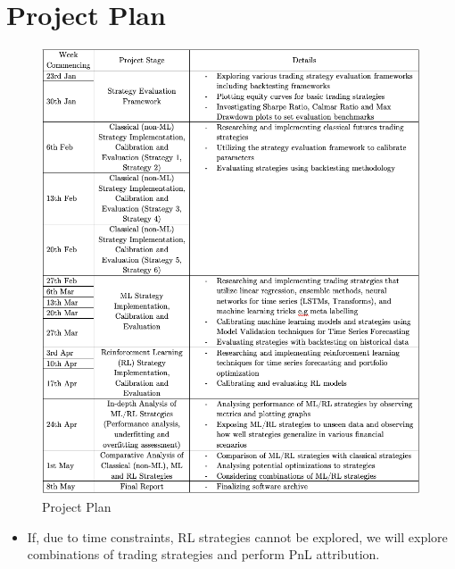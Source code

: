 \chapter{Project Plan}


\begin{figure}[h]
    \centering
    \includegraphics[scale=0.6]{project_plan/Screenshot 2023-01-26 at 01.00.03.png}
    \caption{Project Plan}
    \label{fig:my_label}
\end{figure}
 \begin{itemize}
\item If, due to time constraints, RL strategies cannot be explored, we will explore combinations of trading strategies and perform PnL attribution.
\end{itemize}

